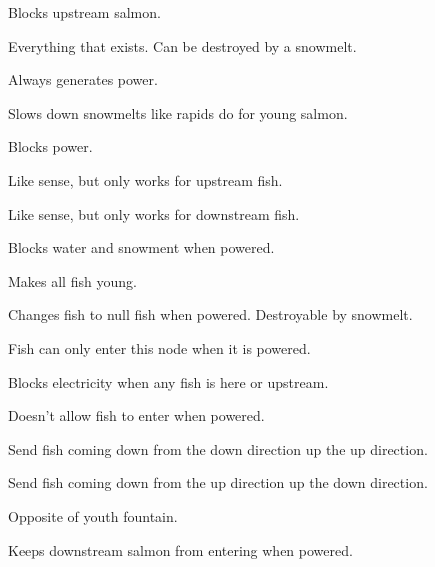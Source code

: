 \documentclass[10pt]{article}
\begin{document}

Blocks upstream salmon.


Everything that exists. Can be destroyed by a snowmelt.


Always generates power.


Slows down snowmelts like rapids do for young salmon.


Blocks power.


Like sense, but only works for upstream fish.


Like sense, but only works for downstream fish.


Blocks water and snowment when powered.


Makes all fish young.


Changes fish to null fish when powered. Destroyable by snowmelt.


Fish can only enter this node when it is powered.


Blocks electricity when any fish is here or upstream.


Doesn't allow fish to enter when powered.


Send fish coming down from the down direction up the up direction.


Send fish coming down from the up direction up the down direction.


Opposite of youth fountain.


Keeps downstream salmon from entering when powered.

\end{document}
